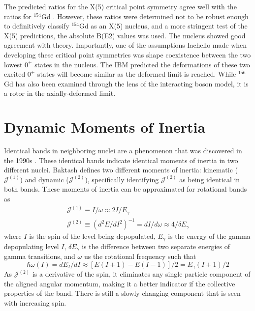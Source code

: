 The predicted ratios for the X(5) critical point symmetry agree well with the ratios for $^{154}$Gd \citep{tonev04:_154gd}. However, these ratios were determined not to be robust enough to definitively classify $^{154}$Gd as an X(5) nucleus, and a more stringent test of the X(5) predictions, the absolute B(E2) values was used. The nucleus showed good agreement with theory. Importantly, one of the assumptions Iachello made when developing these critical point symmetries was shape coexistence between the two lowest $0^+$ states in the nucleus. The IBM predicted the deformations of these two excited $0^+$ states will become similar as the deformed limit is reached\citep{werner08:_x5}. While $^{156}$Gd has also been examined through the lens of the interacting boson model, it is a rotor in the axially-deformed limit.



\section{Dynamic Moments of Inertia}
\label{sec:Dynamic}

Identical bands in neighboring nuclei are a phenomenon that was discovered in the 1990s \citep{baktash95:_dynamic_inertia}. These identical bands indicate identical moments of inertia in two different nuclei. Baktash\citep{baktash95:_dynamic_inertia} defines two different moments of inertia: kinematic ($\mathscr{J}^{(1)}$) and dynamic ($\mathscr{J}^{(2)}$), specifically identifying $\mathscr{J}^{(2)}$ as being identical in both bands. These moments of inertia can be approximated for rotational bands as 
\begin{equation}
    \begin{split}
        \mathscr{J}^{(1)}\equiv I/\omega \approx 2I/E_{\gamma} \\
        \mathscr{J}^{(2)}\equiv (d^2E/dI^2)^{-1} = dI/d\omega \approx 4/\delta E_{\gamma}
    \end{split}
\end{equation}
where $I$ is the spin of the level being depopulated, $E_{\gamma}$ is the energy of the gamma depopulating level $I$, $\delta E_{\gamma}$ is the difference between two separate energies of gamma transitions, and $\omega$ us the rotational frequency such that 
\begin{equation}
    \hbar \omega(I) =dE_{I}/dI \approx \left[E(I+1)-E(I-1)\right]/2 = E_{\gamma}(I+1)/2
\end{equation}
As $\mathscr{J}^{(2)}$ is a derivative of the spin, it eliminates any single particle component of the aligned angular momentum, making it a better indicator if the collective properties of the band. There is still a slowly changing component that is seen with increasing spin.

